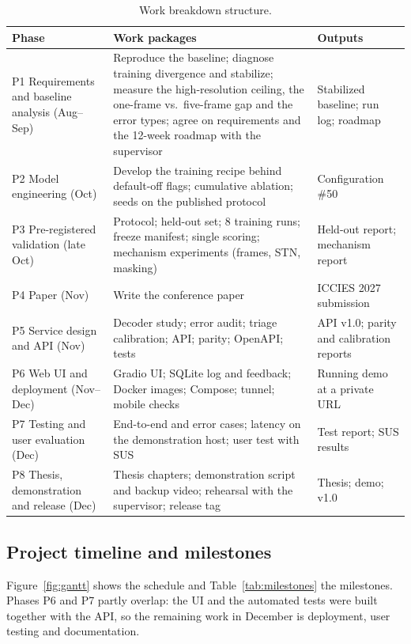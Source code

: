 \documentclass[11pt,a4paper]{article}
\begin{document}
\begin{table}[H]
\centering\small
\caption{Work breakdown structure.}\label{tab:wbs}
\begin{tabularx}{\textwidth}{@{}P{3.7cm}LP{3.6cm}@{}}
\toprule
Phase & Work packages & Outputs \\
\midrule
P1 Requirements and baseline analysis (Aug--Sep) & Reproduce the baseline; diagnose training divergence and stabilize; measure the high-resolution ceiling, the one-frame vs.\ five-frame gap and the error types; agree on requirements and the 12-week roadmap with the supervisor & Stabilized baseline; run log; roadmap \\
P2 Model engineering (Oct) & Develop the training recipe behind default-off flags; cumulative ablation; seeds on the published protocol & Configuration \#50 \\
P3 Pre-registered validation (late Oct) & Protocol; held-out set; 8 training runs; freeze manifest; single scoring; mechanism experiments (frames, STN, masking) & Held-out report; mechanism report \\
P4 Paper (Nov) & Write the conference paper & ICCIES 2027 submission \\
P5 Service design and API (Nov) & Decoder study; error audit; triage calibration; API; parity; OpenAPI; tests & API v1.0; parity and calibration reports \\
P6 Web UI and deployment (Nov--Dec) & Gradio UI; SQLite log and feedback; Docker images; Compose; tunnel; mobile checks & Running demo at a private URL \\
P7 Testing and user evaluation (Dec) & End-to-end and error cases; latency on the demonstration host; user test with SUS & Test report; SUS results \\
P8 Thesis, demonstration and release (Dec) & Thesis chapters; demonstration script and backup video; rehearsal with the supervisor; release tag & Thesis; demo; v1.0 \\
\bottomrule
\end{tabularx}
\end{table}

\subsection{Project timeline and milestones}

Figure~\ref{fig:gantt} shows the schedule and Table~\ref{tab:milestones} the milestones. Phases P6 and P7 partly overlap: the UI and the automated tests were built together with the API, so the remaining work in December is deployment, user testing and documentation.
\end{document}
